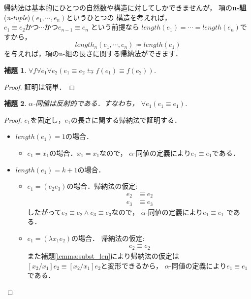 \documentclass{ltjsbook}%
\newtheorem{lemma}{補題}[section]%
\newcommand\lemmaname{補題}%
\newcommand\term[2]{\textbf{#1}{(\textit{#2})}}%
\begin{document}
帰納法は基本的にひとつの自然数や構造に対してしかできませんが，%
項の\term{n-組}{n-tuple}$(\mathit{e}_1,\cdots,\mathit{e}_n)$というひとつの%
構造を考えれば，%
$\mathit{e}_1\equiv\mathit{e}_2かつ\cdots%
かつ\mathit{e}_{n-1}\equiv\mathit{e}_n$%
という前提なら%
$length(\mathit{e}_1)=\cdots=length(\mathit{e}_n)$ですから，%
\begin{equation}%
  length_n(\mathit{e}_1,\cdots,\mathit{e}_n)\coloneqq%
  length(\mathit{e}_1)%
\end{equation}%
を与えれば，項のn-組の長さに関する帰納法ができます．%
\begin{lemma}%
  \label{lemma:alpha_fequal}%
  $\forall\mathit{f}\forall\mathit{e}_1\forall\mathit{e}_2%
  (\mathit{e}_1\equiv\mathit{e}_2\leftrightarrows%
  \mathit{f}(\mathit{e}_1)\equiv\mathit{f}(\mathit{e}_2))$.%
\end{lemma}%
\begin{proof}%
  証明は簡単．%
\end{proof}%
\begin{lemma}%
  $\alpha$-同値は反射的である．すなわち，%
  $\forall\mathit{e}_1(\mathit{e}_1\equiv\mathit{e}_1)$.%
\end{lemma}%
\begin{proof}%
  $\mathit{e}_1を固定し$，$\mathit{e}_1$の長さに関する帰納法で証明する．%
  \begin{itemize}%
  \item $length(\mathit{e}_1)=1$の場合．%
  \begin{itemize}%
  \item $\mathit{e}_1=\mathit{x}_1$の場合．$\mathit{x}_1=\mathit{x}_1$なので，%
    $\alpha$-同値の定義により$\mathit{e}_1\equiv\mathit{e}_1$である．%
  \end{itemize}%
  \item $length(\mathit{e}_1)=k + 1$の場合．%
  \begin{itemize}%
  \item $\mathit{e}_1=(\mathit{e}_2\mathit{e}_3)$の場合．帰納法の仮定:%
    \begin{align}%
      \mathit{e}_2&\equiv \mathit{e}_2\\%
      \mathit{e}_3&\equiv \mathit{e}_3%
    \end{align}%
    したがって$\mathit{e}_2\equiv \mathit{e}_2%
    \land \mathit{e}_3\equiv \mathit{e}_3$なので，%
    $\alpha$-同値の定義により$\mathit{e}_1\equiv \mathit{e}_1$%
    である．%
  \item $\mathit{e}_1=(\lambda \mathit{x}_1\mathit{e}_2)$の場合．%
    帰納法の仮定:%
    \begin{align}%
      \mathit{e}_2\equiv\mathit{e}_2%
    \end{align}%
    また\lemmaname\ref{lemma:subst_len}により帰納法の仮定は%
    $[\mathit{x}_2/\mathit{x}_1]\mathit{e}_2\equiv%
    [\mathit{x}_2/\mathit{x}_1]\mathit{e}_2$と変形できるから，%
    $\alpha$-同値の定義により$\mathit{e}_1\equiv \mathit{e}_1$である．%
  \end{itemize}%
  \end{itemize}%
\end{proof}%
\end{document}

